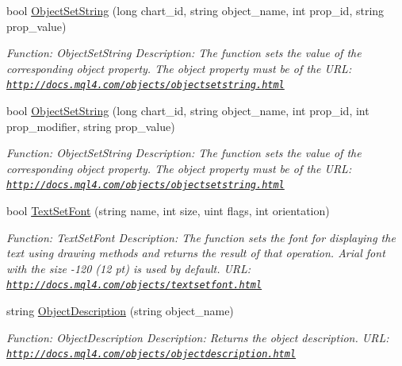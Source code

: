 \begin{DoxyCompactItemize}
bool \hyperlink{class_m_q_l4_c_sharp_1_1_base_1_1_m_q_l_base_aead55041aaf954f1fd3a52771667f4d0}{Object\+Set\+String} (long chart\+\_\+id, string object\+\_\+name, int prop\+\_\+id, string prop\+\_\+value)
\begin{DoxyCompactList}\small\item\em Function\+: Object\+Set\+String Description\+: The function sets the value of the corresponding object property. The object property must be of the U\+RL\+: \href{http://docs.mql4.com/objects/objectsetstring.html}{\tt http\+://docs.\+mql4.\+com/objects/objectsetstring.\+html} \end{DoxyCompactList}\item 
bool \hyperlink{class_m_q_l4_c_sharp_1_1_base_1_1_m_q_l_base_a55955016e5805090107af98c0c6a2c64}{Object\+Set\+String} (long chart\+\_\+id, string object\+\_\+name, int prop\+\_\+id, int prop\+\_\+modifier, string prop\+\_\+value)
\begin{DoxyCompactList}\small\item\em Function\+: Object\+Set\+String Description\+: The function sets the value of the corresponding object property. The object property must be of the U\+RL\+: \href{http://docs.mql4.com/objects/objectsetstring.html}{\tt http\+://docs.\+mql4.\+com/objects/objectsetstring.\+html} \end{DoxyCompactList}\item 
bool \hyperlink{class_m_q_l4_c_sharp_1_1_base_1_1_m_q_l_base_a02e45d3fd2469e0c64d8b348fe144cda}{Text\+Set\+Font} (string name, int size, uint flags, int orientation)
\begin{DoxyCompactList}\small\item\em Function\+: Text\+Set\+Font Description\+: The function sets the font for displaying the text using drawing methods and returns the result of that operation. Arial font with the size -\/120 (12 pt) is used by default. U\+RL\+: \href{http://docs.mql4.com/objects/textsetfont.html}{\tt http\+://docs.\+mql4.\+com/objects/textsetfont.\+html} \end{DoxyCompactList}\item 
string \hyperlink{class_m_q_l4_c_sharp_1_1_base_1_1_m_q_l_base_a71641692e22135e23e5f17792e2c4087}{Object\+Description} (string object\+\_\+name)
\begin{DoxyCompactList}\small\item\em Function\+: Object\+Description Description\+: Returns the object description. U\+RL\+: \href{http://docs.mql4.com/objects/objectdescription.html}{\tt http\+://docs.\+mql4.\+com/objects/objectdescription.\+html} \end{DoxyCompactList}\item 

\end{DoxyCompactItemize}
